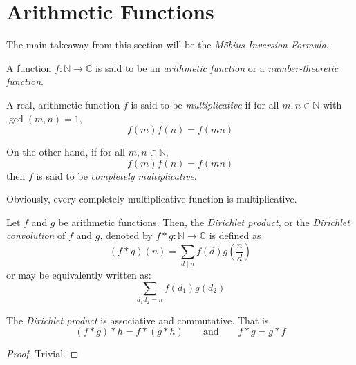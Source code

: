 \newcommand{\ord}{\operatorname{ord}}
\section{Arithmetic Functions}
The main takeaway from this section will be the \textit{M\"obius Inversion Formula}.
\begin{definition}
    A function $f:\mathbb{N}\to\mathbb{C}$ is said to be an \textit{arithmetic function} or a \textit{number-theoretic function}.
\end{definition}

\begin{definition}
    A real, arithmetic function $f$ is said to be \textit{multiplicative} if for all $m,n\in\mathbb{N}$ with $\gcd(m,n) = 1$,
    \begin{equation*}
        f(m)f(n) = f(mn)
    \end{equation*}

    On the other hand, if for all $m,n\in\mathbb{N}$, 
    \begin{equation*}
        f(m)f(n) = f(mn)
    \end{equation*}
    then $f$ is said to be \textit{completely multiplicative}.
\end{definition}
Obviously, every completely multiplicative function is multiplicative.

\begin{definition}
    Let $f$ and $g$ be arithmetic functions. Then, the \textit{Dirichlet product}, or the \textit{Dirichlet convolution} of $f$ and $g$, denoted by $f*g:\mathbb{N}\to\mathbb{C}$ is defined as 
    \begin{equation*}
        (f*g)(n) = \sum_{d\mid n} f(d)g\left(\frac{n}{d}\right)
    \end{equation*}
    or may be equivalently written as:
    \begin{equation*}
        \sum_{d_1d_2 = n}f(d_1)g(d_2)
    \end{equation*}
\end{definition}

\begin{theorem}
    The \textit{Dirichlet product} is associative and commutative. That is, 
    \begin{equation*}
        (f*g)*h = f*(g*h) \qquad\text{and}\qquad f*g = g*f
    \end{equation*}
\end{theorem}
\begin{proof}
    Trivial.
\end{proof}

